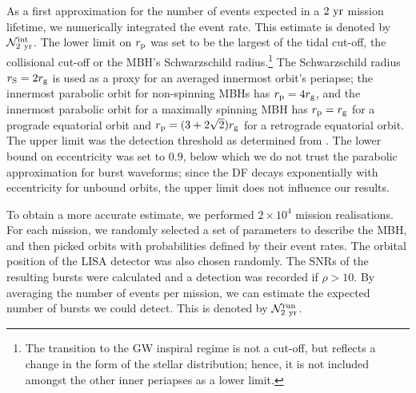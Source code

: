 As a first approximation for the number of events expected in a $2~\mathrm{yr}$ mission lifetime, we numerically integrated the event rate. This estimate is denoted by $\mathcal{N}_{2~\mathrm{yr}}^\mathrm{int}$. The lower limit on $r_\mathrm{p}$ was set to be the largest of the tidal cut-off, the collisional cut-off or the MBH's Schwarzschild radius.\footnote{The transition to the GW inspiral regime is not a cut-off, but reflects a change in the form of the stellar distribution; hence, it is not included amongst the other inner periapses as a lower limit.} The Schwarzschild radius $r_\mathrm{S} = 2 r_\mathrm{g}$ is used as a proxy for an averaged innermost orbit's periapse; the innermost parabolic orbit for non-spinning MBHs has $r_\mathrm{p} = 4r_\mathrm{g}$, and the innermost parabolic orbit for a maximally spinning MBH has $r_\mathrm{p} = r_\mathrm{g}$ for a prograde equatorial orbit and $r_\mathrm{p} = (3 + 2\sqrt{2})r_\mathrm{g}$ for a retrograde equatorial orbit. The upper limit was the detection threshold as determined from . The lower bound on eccentricity was set to $0.9$, below which we do not trust the parabolic approximation for burst waveforms; since the DF decays exponentially with eccentricity for unbound orbits, the upper limit does not influence our results.

To obtain a more accurate estimate, we performed $2 \times 10^4$ mission realisations. For each mission, we randomly selected a set of parameters to describe the MBH, and then picked orbits with probabilities defined by their event rates. The orbital position of the LISA detector was also chosen randomly. The SNRs of the resulting bursts were calculated and a detection was recorded if $\rho > 10$. By averaging the number of events per mission, we can estimate the expected number of bursts we could detect. This is denoted by $\mathcal{N}_{2~\mathrm{yr}}^\mathrm{run}$.

